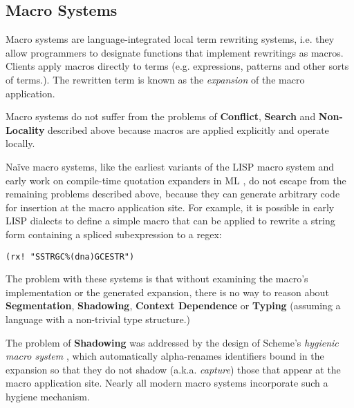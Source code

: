 {{\subsection{Macro Systems}\label{sec:macro-systems}
Macro systems are language-integrated local term rewriting systems, i.e. they allow programmers to designate functions that implement rewritings as macros. Clients apply macros directly to terms (e.g. expressions, patterns and other sorts of terms.). The rewritten term is known as the \emph{expansion} of the macro application.

Macro systems do not suffer from the problems of \textbf{Conflict}, \textbf{Search} and \textbf{Non-Locality} described above because macros are applied explicitly and operate locally.

Na\"ive macro systems, like the earliest variants of the LISP macro system \cite{Hart63a} and early work on compile-time quotation expanders in ML \cite{mauny1994complete}, do not escape from the remaining problems described above, because they can generate arbitrary code for insertion at the macro application site. For example, it is possible in early LISP dialects to define a simple macro  that can be applied to rewrite a string form containing a spliced subexpression to a regex:
\begin{lstlisting}[numbers=none]
(rx! "SSTRGC%(dna)GCESTR")
\end{lstlisting}
The problem with these systems is that without examining the macro's implementation or the generated expansion, there is no way to reason about \textbf{Segmentation}, \textbf{Shadowing}, \textbf{Context Dependence} or \textbf{Typing} (assuming a language with a non-trivial type structure.)

The problem of \textbf{Shadowing} was addressed by the design of Scheme's \emph{hygienic macro system} \cite{Kohlbecker86a,DBLP:conf/popl/Adams15}, which automatically alpha-renames identifiers bound in the expansion so that they do not shadow (a.k.a. \emph{capture}) those that appear at the macro application site. Nearly all modern macro systems incorporate such a hygiene mechanism. %

}}
